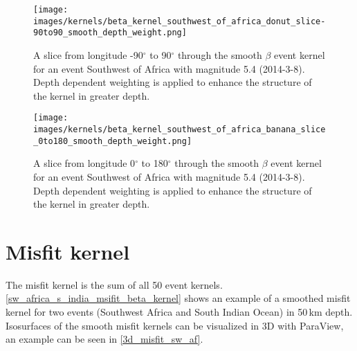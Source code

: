 \begin{figure}[h]
\begin{center}
\texttt{[image: images/kernels/beta\_kernel\_southwest\_of\_africa\_donut\_slice-90to90\_smooth\_depth\_weight.png]}
\caption[Slice from longitude -90$^\circ$ to 90$^\circ$ through the smooth $\beta$ event kernel for one event]{A slice from 
longitude -90$^\circ$ to 90$^\circ$ through the smooth $\beta$ event kernel for an event Southwest of Africa with 
magnitude 5.4 (2014-3-8). Depth dependent weighting is applied to enhance the structure of the kernel in greater depth.}  
\label{sw_africa_donut}
\texttt{[image: images/kernels/beta\_kernel\_southwest\_of\_africa\_banana\_slice\_0to180\_smooth\_depth\_weight.png]}
\caption[Slice from longitude 0$^\circ$ to 180$^\circ$ through the smooth $\beta$ event kernel for one event]{A slice from longitude 
0$^\circ$ to 180$^\circ$ through the smooth $\beta$ event kernel for an event Southwest of Africa with magnitude 5.4 (2014-3-8).
 Depth dependent weighting is applied to enhance the structure of the kernel in greater depth.}  
\label{sw_africa_banana}
\end{center}
\end{figure}


\section{Misfit kernel}

The misfit kernel is the sum of all 50 event kernels. \autoref{sw_africa_s_india_msifit_beta_kernel} shows an example of a 
smoothed misfit kernel for two events (Southwest Africa and South Indian Ocean) in 50$\,$km depth.
Isosurfaces of the smooth misfit kernels can be visualized in 3D with ParaView, an example can be seen in \autoref{3d_misfit_sw_af}.


